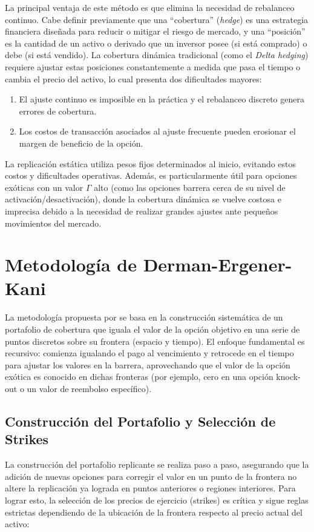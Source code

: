 La principal ventaja de este método es que elimina la necesidad de rebalanceo continuo. Cabe definir previamente que una ``cobertura'' (\textit{hedge}) es una estrategia financiera diseñada para reducir o mitigar el riesgo de mercado, y una ``posición'' es la cantidad de un activo o derivado que un inversor posee (si está comprado) o debe (si está vendido). La cobertura dinámica tradicional (como el \textit{Delta hedging}) requiere ajustar estas posiciones constantemente a medida que pasa el tiempo o cambia el precio del activo, lo cual presenta dos dificultades mayores: 
\begin{enumerate} 
  \item El ajuste continuo es imposible en la práctica y el rebalanceo discreto genera errores de cobertura. 
  \item Los costos de transacción asociados al ajuste frecuente pueden erosionar el margen de beneficio de la opción. 
\end{enumerate}

La replicación estática utiliza pesos fijos determinados al inicio, evitando estos costos y dificultades operativas. Además, es particularmente útil para opciones exóticas con un valor $\Gamma$ alto (como las opciones barrera cerca de su nivel de activación/desactivación), donde la cobertura dinámica se vuelve costosa e imprecisa debido a la necesidad de realizar grandes ajustes ante pequeños movimientos del mercado.

\section{Metodología de Derman-Ergener-Kani}

La metodología propuesta por \cite{derman1994static} se basa en la construcción sistemática de un portafolio de cobertura que iguala el valor de la opción objetivo en una serie de puntos discretos sobre su frontera (espacio y tiempo). El enfoque fundamental es recursivo: comienza igualando el pago al vencimiento y retrocede en el tiempo para ajustar los valores en la barrera, aprovechando que el valor de la opción exótica es conocido en dichas fronteras (por ejemplo, cero en una opción knock-out o un valor de reembolso específico).

\subsection{Construcción del Portafolio y Selección de Strikes}

La construcción del portafolio replicante se realiza paso a paso, asegurando que la adición de nuevas opciones para corregir el valor en un punto de la frontera no altere la replicación ya lograda en puntos anteriores o regiones interiores. Para lograr esto, la selección de los precios de ejercicio (strikes) es crítica y sigue reglas estrictas dependiendo de la ubicación de la frontera respecto al precio actual del activo:

